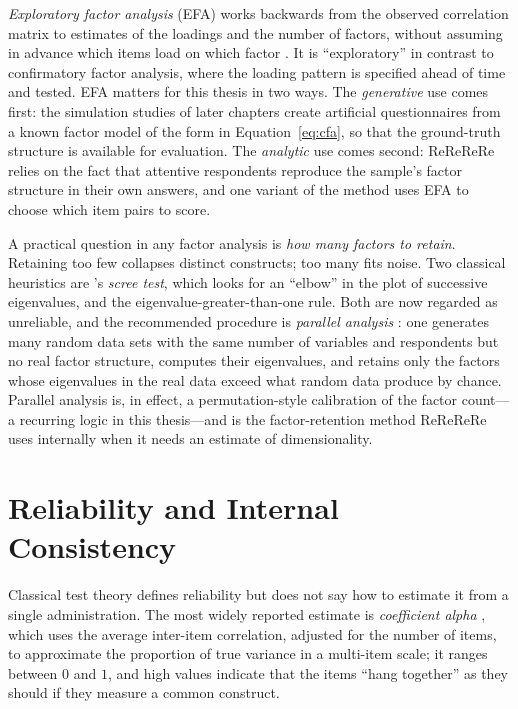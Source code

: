 \emph{Exploratory factor analysis} (EFA) works backwards from the observed
correlation matrix to estimates of the loadings and the number of factors,
without assuming in advance which items load on which factor
\parencite{fabrigar1999evaluating, costello2005best}. It is ``exploratory'' in
contrast to confirmatory factor analysis, where the loading pattern is specified
ahead of time and tested. EFA matters for this thesis in two ways. The
\emph{generative} use comes first: the simulation studies of later chapters
create artificial questionnaires from a known factor model of the form in
Equation~\ref{eq:cfa}, so that the ground-truth structure is available for
evaluation. The \emph{analytic} use comes second: ReReReRe relies on the fact
that attentive respondents reproduce the sample's factor structure in their own
answers, and one variant of the method uses EFA to choose which item pairs to
score.

A practical question in any factor analysis is \emph{how many factors to
retain}. Retaining too few collapses distinct constructs; too many fits noise.
Two classical heuristics are \textcite{cattell1966scree}'s \emph{scree test},
which looks for an ``elbow'' in the plot of successive eigenvalues, and the
eigenvalue-greater-than-one rule. Both are now regarded as unreliable, and the
recommended procedure is \emph{parallel analysis} \parencite{horn1965rationale}:
one generates many random data sets with the same number of variables and
respondents but no real factor structure, computes their eigenvalues, and
retains only the factors whose eigenvalues in the real data exceed what random
data produce by chance. Parallel analysis is, in effect, a permutation-style
calibration of the factor count---a recurring logic in this thesis---and is the
factor-retention method ReReReRe uses internally when it needs an estimate of
dimensionality.

\section{Reliability and Internal Consistency}
\label{sec:reliability}

Classical test theory defines reliability but does not say how to estimate it
from a single administration. The most widely reported estimate is
\emph{coefficient alpha} \parencite{cronbach1951coefficient}, which uses the
average inter-item correlation, adjusted for the number of items, to approximate
the proportion of true variance in a multi-item scale; it ranges between $0$ and
$1$, and high values indicate that the items ``hang together'' as they should if
they measure a common construct.


